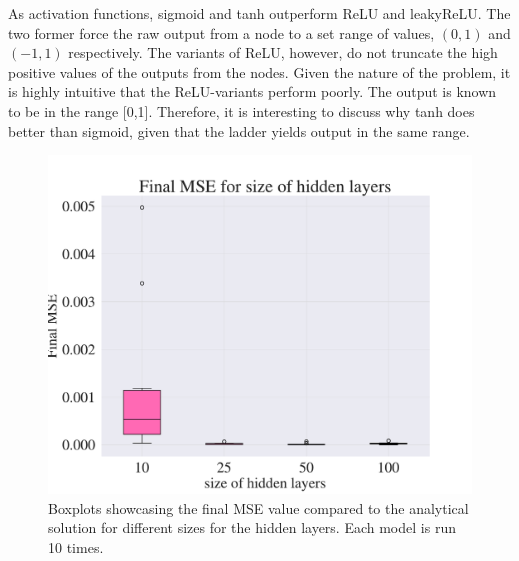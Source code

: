 
As activation functions, sigmoid and tanh outperform ReLU and leakyReLU. 
The two former force the raw output from a node to a set range of values, $(0,1)$ and $(-1,1)$ respectively. 
The variants of ReLU, however, do not truncate the high positive values of the outputs from the nodes. 
Given the nature of the problem, it is highly intuitive that the ReLU-variants perform poorly. 
The output is known to be in the range [0,1]. 
Therefore, it is interesting to discuss why tanh does better than sigmoid, given that the ladder yields output in the same range. 

\begin{figure}[h!]
    \centering
    \includegraphics[width=1.0\linewidth]{project_3/plots/value_layers_search.pdf}
    \caption{Boxplots showcasing the final MSE value compared to the analytical solution for different sizes for the hidden layers. Each model is run 10 times. }
    \label{fig:boxplots_size_of_layers}
\end{figure}



